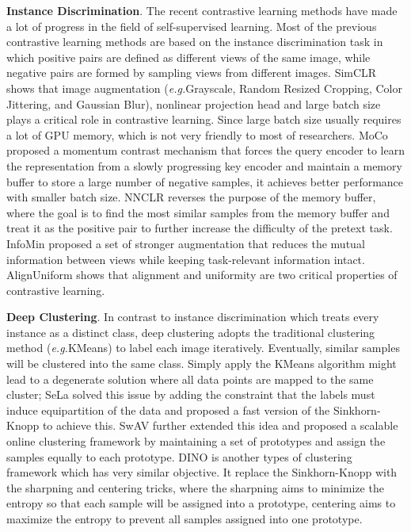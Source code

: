 \documentclass{article}
\newcommand{\<}{\left\langle}
\renewcommand{\>}{\right\rangle}
\newcommand{\eg}{{\emph{e.g.}}}
\begin{document}
\textbf{Instance Discrimination}.
The recent contrastive learning methods \cite{cpc, cmc, simclr, moco, goodview, pirl, huang2021self, deepinfomax, mochi} have made a lot of progress in the field of self-supervised learning. Most of the previous contrastive learning methods are based on the instance discrimination \cite{instance_discrimination} task in which positive pairs are defined as different views of the same image, while negative pairs are formed by sampling views from different images. SimCLR \cite{simclr, simclrv2} shows that image augmentation (\eg Grayscale, Random Resized Cropping, Color Jittering, and Gaussian Blur), nonlinear projection head and large batch size plays a critical role in contrastive learning. Since large batch size usually requires a lot of GPU memory, which is not very friendly to most of researchers. MoCo \cite{moco, mocov2} proposed a momentum contrast mechanism that forces the query encoder to learn the representation from a slowly progressing key encoder and maintain a memory buffer to store a large number of negative samples, it achieves better performance with smaller batch size.  NNCLR \cite{nnclr} reverses the purpose of the memory buffer, where the goal is to find the most similar samples from the memory buffer and treat it as the positive pair to further increase the difficulty of the pretext task. InfoMin \cite{goodview} proposed a set of stronger augmentation that reduces the mutual information between views while keeping task-relevant information intact. AlignUniform \cite{alignment_uniformity} shows that alignment and uniformity are two critical properties of contrastive learning. 

\textbf{Deep Clustering}. 
In contrast to instance discrimination which treats every instance as a distinct class, deep clustering \cite{deepclustering} adopts the traditional clustering method (\eg KMeans) to label each image iteratively. Eventually, similar samples will be clustered into the same class. Simply apply the KMeans algorithm might lead to a degenerate solution where all data points are mapped to the same cluster; SeLa \cite{Self-labelling} solved this issue by adding the constraint that the labels must induce equipartition of the data and proposed a fast version of the Sinkhorn-Knopp to achieve this. SwAV \cite{swav} further extended this idea and proposed a scalable online clustering framework by maintaining a set of prototypes and assign the samples equally to each prototype. DINO \cite{dino} is another types of clustering framework which has very similar objective. It replace the Sinkhorn-Knopp with the sharpning and centering tricks, where the sharpning aims to minimize the entropy so that each sample will be assigned into a prototype, centering aims to maximize the entropy to prevent all samples assigned into one prototype.  
\end{document}
